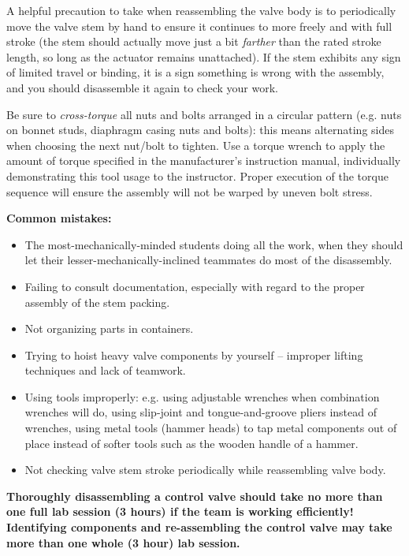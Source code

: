 \begin{itemize}
A helpful precaution to take when reassembling the valve body is to periodically move the valve stem by hand to ensure it continues to more freely and with full stroke (the stem should actually move just a bit {\it farther} than the rated stroke length, so long as the actuator remains unattached).  If the stem exhibits any sign of limited travel or binding, it is a sign something is wrong with the assembly, and you should disassemble it again to check your work.

Be sure to {\it cross-torque} all nuts and bolts arranged in a circular pattern (e.g. nuts on bonnet studs, diaphragm casing nuts and bolts): this means alternating sides when choosing the next nut/bolt to tighten.  Use a torque wrench to apply the amount of torque specified in the manufacturer's instruction manual, individually demonstrating this tool usage to the instructor.  Proper execution of the torque sequence will ensure the assembly will not be warped by uneven bolt stress.

\vskip 10pt

{\bf Common mistakes:}

\begin{itemize}
\item{} The most-mechanically-minded students doing all the work, when they should let their lesser-mechanically-inclined teammates do most of the disassembly.
\item{} Failing to consult documentation, especially with regard to the proper assembly of the stem packing.
\item{} Not organizing parts in containers.
\item{} Trying to hoist heavy valve components by yourself -- improper lifting techniques and lack of teamwork.
\item{} Using tools improperly: e.g. using adjustable wrenches when combination wrenches will do, using slip-joint and tongue-and-groove pliers instead of wrenches, using metal tools (hammer heads) to tap metal components out of place instead of softer tools such as the wooden handle of a hammer.
\item{} Not checking valve stem stroke periodically while reassembling valve body.
\end{itemize}

\vskip 10pt

{\bf Thoroughly disassembling a control valve should take no more than one full lab session (3 hours) if the team is working efficiently!  Identifying components and re-assembling the control valve may take more than one whole (3 hour) lab session.}



\end{itemize}
